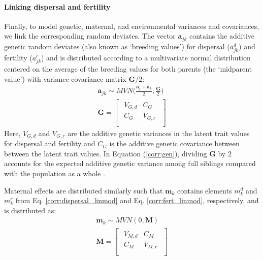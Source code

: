 \documentclass[11pt]{article}
\begin{document}
\paragraph{Linking dispersal and fertility}
Finally, to model genetic, maternal, and environmental variances and covariances, we link the corresponding random deviates.
The vector $\bm{a}_{jk}$ contains the additive genetic random deviates (also known as `breeding values') for dispersal ($a^{d}_{jk}$) and fertility ($a^{r}_{jk}$) and is distributed according to a multivariate normal distribution centered on the average of the breeding values for both parents (the `midparent value') with variance-covariance matrix $\bm{G}/2$:
%
\begin{gather} \label{corr:gen}
  \bm{a}_{jk} \sim \mathit{MVN} \Big( \frac{\bm{a}_{j} + \bm{a}_{k}}{2}, \frac{\bm{G}}{2} \Big) \\[10pt]
  \bm{G} =
  \begin{bmatrix}
    \begin{array}{ll}
      V_{G,d} &C_{G}   \\
      C_{G}   &V_{G,r} \\
    \end{array}
  \end{bmatrix}
\end{gather}
%
Here, $V_{G,d}$ and $V_{G,r}$ are the additive genetic variances in the latent trait values for dispersal and fertility and $C_{G}$ is the additive genetic covariance between between the latent trait values.
In Equation (\ref{corr:gen}), dividing $\bm{G}$ by $2$ accounts for the expected additive genetic variance among full siblings compared with the population as a whole \citep{roughgarden_theory_1979}.


Maternal effects are distributed similarly such that $\bm{m}_{k}$ contains elements $m^{d}_{k}$ and $m^{r}_{k}$ from Eq. \ref{corr:dispersal_linmod} and Eq. \ref{corr:fert_linmod}, respectively, and is distributed as:
%
\begin{gather} \label{corr:mat}
  \bm{m}_{k} \sim \mathit{MVN} (0, \bm{M}) \\[5pt]
  \bm{M} =
  \begin{bmatrix}
    \begin{array}{ll}
      V_{M,d} &C_{M}   \\
      C_{M}   &V_{M,r} \\
    \end{array}
  \end{bmatrix}
\end{gather}
%
\end{document}
